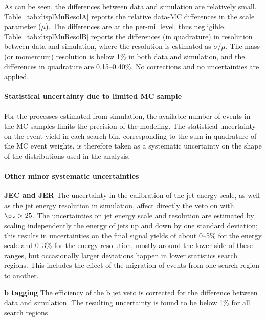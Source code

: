As can be seen, the differences between data and simulation are
relatively small. Table~\ref{tab:displMuResolA} reports the relative
data-MC differences in the scale parameter ($\mu$). The differences are
at the per-mil level, thus negligible.
Table~\ref{tab:displMuResolB} reports the differences (in quadrature) in
resolution between data and simulation, where the resolution is
estimated as $\sigma/\mu$. The mass (or momentum) resolution is below
1\% in both data and simulation, and the differences in quadrature are
0.15--0.40\%. No corrections and no uncertainties are applied.

\paragraph{Statistical uncertainty due to limited MC sample}
For the processes estimated from simulation, the available number of
events in the MC samples limits the precision of the modeling.
The statistical uncertainty on the event yield in each search bin,
corresponding to the sum in quadrature of the MC event weights, is
therefore taken as a systematic uncertainty on the shape of the
distributions used in the analysis.



\paragraph{Other minor systematic uncertainties}
\textbf{JEC and JER}
The uncertainty in the calibration of the jet energy scale, as well
as the jet energy resolution in simulation, affect directly the veto
on \PQb with $\pt>25$\GeV.
The uncertainties on jet energy scale and resolution are estimated by
scaling independently the energy of jets up and down by one standard
deviation; this results in uncertainties on the final signal yields of about
0--5\% for the energy scale and 0--3\% for the energy resolution,
mostly around the lower side of these ranges, but occasionally larger
deviations happen in lower statistics search regions.
This includes the effect of the migration of events from one search
region to another.

\textbf{b tagging}
The efficiency of the b jet veto is corrected for the difference
between data and simulation.
The resulting uncertainty is found to
be below 1\% for all search regions.

